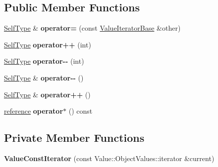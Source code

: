 \subsection*{Public Member Functions}
\begin{DoxyCompactItemize}
\item 
\hypertarget{class_json_1_1_value_const_iterator_ad1b1c11f8d7fb22d4d3c231915f2b15b}{\hyperlink{class_json_1_1_value_iterator_base}{Self\-Type} \& {\bfseries operator=} (const \hyperlink{class_json_1_1_value_iterator_base}{Value\-Iterator\-Base} \&other)}\label{class_json_1_1_value_const_iterator_ad1b1c11f8d7fb22d4d3c231915f2b15b}

\item 
\hypertarget{class_json_1_1_value_const_iterator_ab3f0c2edbfc8f7d60645f3d597d05e28}{\hyperlink{class_json_1_1_value_iterator_base}{Self\-Type} {\bfseries operator++} (int)}\label{class_json_1_1_value_const_iterator_ab3f0c2edbfc8f7d60645f3d597d05e28}

\item 
\hypertarget{class_json_1_1_value_const_iterator_a94935961e9331c6f7b907b05ec8df75e}{\hyperlink{class_json_1_1_value_iterator_base}{Self\-Type} {\bfseries operator-\/-\/} (int)}\label{class_json_1_1_value_const_iterator_a94935961e9331c6f7b907b05ec8df75e}

\item 
\hypertarget{class_json_1_1_value_const_iterator_a31415e44e44e56fb2bfda7e8bb784646}{\hyperlink{class_json_1_1_value_iterator_base}{Self\-Type} \& {\bfseries operator-\/-\/} ()}\label{class_json_1_1_value_const_iterator_a31415e44e44e56fb2bfda7e8bb784646}

\item 
\hypertarget{class_json_1_1_value_const_iterator_a2cfe2f7a94a688186efdafb1b181c319}{\hyperlink{class_json_1_1_value_iterator_base}{Self\-Type} \& {\bfseries operator++} ()}\label{class_json_1_1_value_const_iterator_a2cfe2f7a94a688186efdafb1b181c319}

\item 
\hypertarget{class_json_1_1_value_const_iterator_aeb44153d71c61ac9397a84d5ecc244c5}{\hyperlink{class_json_1_1_value}{reference} {\bfseries operator$\ast$} () const }\label{class_json_1_1_value_const_iterator_aeb44153d71c61ac9397a84d5ecc244c5}

\end{DoxyCompactItemize}
\subsection*{Private Member Functions}
\begin{DoxyCompactItemize}
\item 
\hypertarget{class_json_1_1_value_const_iterator_aa0a87edf5f1097f91dca5f2a389c4abd}{{\bfseries Value\-Const\-Iterator} (const Value\-::\-Object\-Values\-::iterator \&current)}\label{class_json_1_1_value_const_iterator_aa0a87edf5f1097f91dca5f2a389c4abd}

\end{DoxyCompactItemize}
